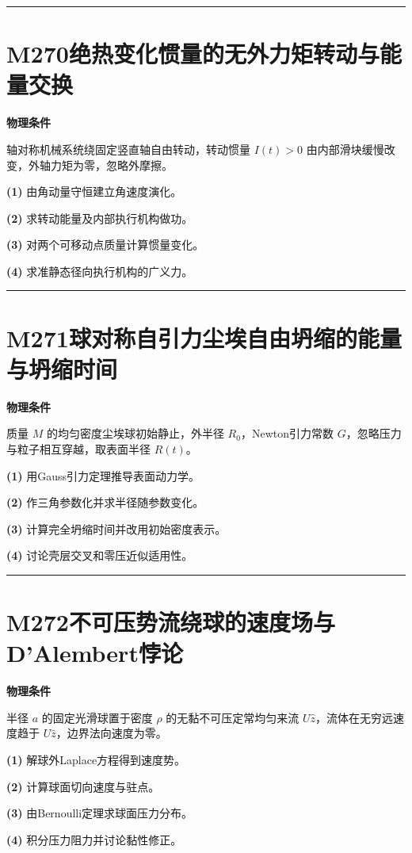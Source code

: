 \documentclass[UTF8,a4paper,11pt,oneside,openany]{ctexbook}
\begin{document}
\par\bigskip\hrule\bigskip
\section*{M270\quad 绝热变化惯量的无外力矩转动与能量交换}
\textbf{物理条件}\par 轴对称机械系统绕固定竖直轴自由转动，转动惯量 \(I(t)>0\) 由内部滑块缓慢改变，外轴力矩为零，忽略外摩擦。
\par\noindent\textbf{(1)} 由角动量守恒建立角速度演化。
\par\noindent\textbf{(2)} 求转动能量及内部执行机构做功。
\par\noindent\textbf{(3)} 对两个可移动点质量计算惯量变化。
\par\noindent\textbf{(4)} 求准静态径向执行机构的广义力。

\par\bigskip\hrule\bigskip
\section*{M271\quad 球对称自引力尘埃自由坍缩的能量与坍缩时间}
\textbf{物理条件}\par 质量 \(M\) 的均匀密度尘埃球初始静止，外半径 \(R_0\)，Newton引力常数 \(G\)，忽略压力与粒子相互穿越，取表面半径 \(R(t)\)。
\par\noindent\textbf{(1)} 用Gauss引力定理推导表面动力学。
\par\noindent\textbf{(2)} 作三角参数化并求半径随参数变化。
\par\noindent\textbf{(3)} 计算完全坍缩时间并改用初始密度表示。
\par\noindent\textbf{(4)} 讨论壳层交叉和零压近似适用性。

\par\bigskip\hrule\bigskip
\section*{M272\quad 不可压势流绕球的速度场与D’Alembert悖论}
\textbf{物理条件}\par 半径 \(a\) 的固定光滑球置于密度 \(\rho\) 的无黏不可压定常均匀来流 \(U\hat z\)，流体在无穷远速度趋于 \(U\hat z\)，边界法向速度为零。
\par\noindent\textbf{(1)} 解球外Laplace方程得到速度势。
\par\noindent\textbf{(2)} 计算球面切向速度与驻点。
\par\noindent\textbf{(3)} 由Bernoulli定理求球面压力分布。
\par\noindent\textbf{(4)} 积分压力阻力并讨论黏性修正。
\end{document}
